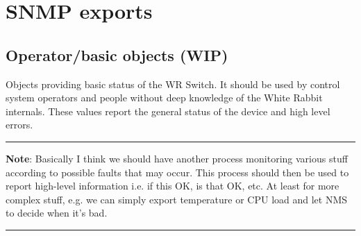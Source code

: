 \section{SNMP exports}
\label{sec:snmp_exports}

\subsection{Operator/basic objects (WIP)}
Objects providing basic status of the WR Switch. It should be used by control
system operators and people without deep knowledge of the White Rabbit
internals. These values report the general status of the device and high level
errors.

\noindent \rule{\textwidth}{2pt}
{\bf Note}: Basically I think we should have another process monitoring various
stuff according to possible faults that may occur. This process should then be
used to report high-level information i.e. if this OK, is that OK, etc. At least
for more complex stuff, e.g. we can simply export temperature or CPU load and
let NMS to decide when it's bad.\\
\noindent \rule{\textwidth}{2pt}

